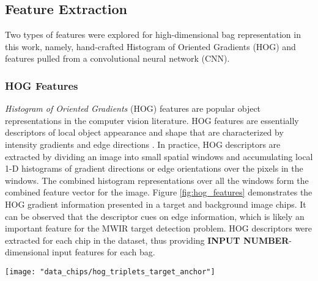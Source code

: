 \subsection{Feature Extraction}
Two types of features were explored for high-dimensional bag representation in this work, namely, hand-crafted Histogram of Oriented Gradients (HOG) and features pulled from a convolutional neural network (CNN).  

\subsubsection{HOG Features}

\textit{Histogram of Oriented Gradients} (HOG) features are popular object representations in the computer vision literature.  HOG features are essentially descriptors of local object appearance and shape that are characterized by intensity gradients and edge directions \citep{Dalal2005HOG}.  In practice, HOG descriptors are extracted by dividing an image into small spatial windows and accumulating local 1-D histograms of gradient directions or edge orientations over the pixels in the windows.  The combined histogram representations over all the windows form the combined feature vector for the image.  Figure \ref{fig:hog_features} demonstrates the HOG gradient information presented in a target and background image chips.  It can be observed that the descriptor cues on edge information, which is likely an important feature for the MWIR target detection problem.  HOG descriptors were extracted for each chip in the dataset, thus providing \textbf{INPUT NUMBER}-dimensional input features for each bag.  

\begin{center}
	\begin{figure*}[h]
		\centering
		\texttt{[image: "data\_chips/hog\_triplets\_target\_anchor"]}
		\caption[HOG features]{Example image chips and corresponding HOG gradient magnitude and direction features over the chip.  In the left column, the chips labeled as ``Anchor" and ``Positive" correspond to positive bags, while th image labeled ``Negative" represents a negative bag because it only contains background pixels.  The images in the right column demonstrate edge direction and magnitude calculated over 3x3 windows across the images.}
		\label{fig:hog_features}
	\end{figure*}
\end{center}

